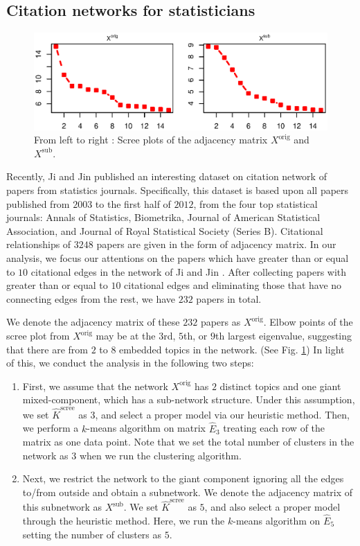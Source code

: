 \documentclass[AMS,STIX1COL]{WileyNJD-v2}
\begin{document}
{\subsection{Citation networks for statisticians}
\label{sec:citation_network}
\begin{figure}[htbp]
\includegraphics[width=1\textwidth]{Fig4.eps}
\caption{From left to right : Scree plots of the adjacency matrix $X^{\mbox{orig}}$ and $X^{\mbox{sub}}$.}
\label{fig:figure4}
\end{figure}
Recently, Ji and Jin \cite{ji2016coauthorship} published an interesting dataset on citation network of papers from statistics journals.
Specifically, this dataset is based upon all papers published from $2003$ to the first half of $2012$, from the four top statistical journals: Annals of Statistics, Biometrika, Journal of American Statistical Association, and Journal of Royal Statistical Society (Series B).
Citational relationships of $3248$ papers are given in the form of adjacency matrix.
In our analysis, we focus our attentions on the papers which have greater than or equal to $10$ citational edges in the network of Ji and Jin \cite{ji2016coauthorship}.
After collecting papers with greater than or equal to $10$ citational edges and eliminating those that have no connecting edges from the rest, we have $232$ papers in total.

We denote the adjacency matrix of these $232$ papers as $X^{\mbox{orig}}$.
Elbow points of the scree plot from $X^{\mbox{orig}}$ may be at the $3$rd, $5$th, or $9$th largest eigenvalue, suggesting that there are from $2$ to $8$ embedded topics in the network. (See Fig. \ref{fig:figure4})
In light of this, we conduct the analysis in the following two steps:
\begin{enumerate}
    \item First, we assume that the network $X^{\mbox{orig}}$ has $2$ distinct topics and one giant mixed-component, which has a sub-network structure. Under this assumption, we set $\widehat{K}^{\mbox{scree}}$ as $3$, and select a proper model via our heuristic method.
        Then, we perform a $k$-means algorithm on matrix $\widehat{E}_{3}$ treating each row of the matrix as one data point.
        Note that we set the total number of clusters in the network as $3$ when we run the clustering algorithm.
    \item Next, we restrict the network to the giant component ignoring all the edges to/from outside and obtain a subnetwork.
        We denote the adjacency matrix of this subnetwork as $X^{\mbox{sub}}$. We set $\widehat{K}^{\mbox{scree}}$ as $5$, and also select a proper model through the heuristic method.
        Here, we run the $k$-means algorithm on $\widehat{E}_{5}$ setting the number of clusters as $5$.
\end{enumerate}

}
\end{document}
